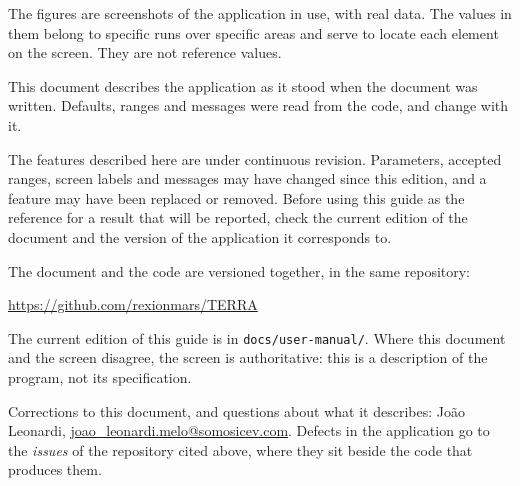 \documentclass[12pt,a4paper]{article}
\begin{document}
\begin{aviso}
The figures are screenshots of the application in use, with real data. The
values in them belong to specific runs over specific areas and serve to locate
each element on the screen. They are not reference values.
\end{aviso}

 This document describes the application as it
stood when the document was written. Defaults, ranges and messages were read
from the code, and change with it.

%

\begin{aviso}
The features described here are under continuous revision. Parameters, accepted
ranges, screen labels and messages may have changed since this edition, and a
feature may have been replaced or removed. Before using this guide as the
reference for a result that will be reported, check the current edition of the
document and the version of the application it corresponds to.

The document and the code are versioned together, in the same repository:

\begin{center}
\url{https://github.com/rexionmars/TERRA}
\end{center}

\noindent The current edition of this guide is in \texttt{docs/user-manual/}.
Where this document and the screen disagree, the screen is authoritative: this
is a description of the program, not its specification.
\end{aviso}

%
%
 Corrections to this document, and questions about what it
describes: Jo\~ao Leonardi, \url{joao_leonardi.melo@somosicev.com}. Defects in
the application go to the \emph{issues} of the repository cited above, where
they sit beside the code that produces them.
\end{document}
